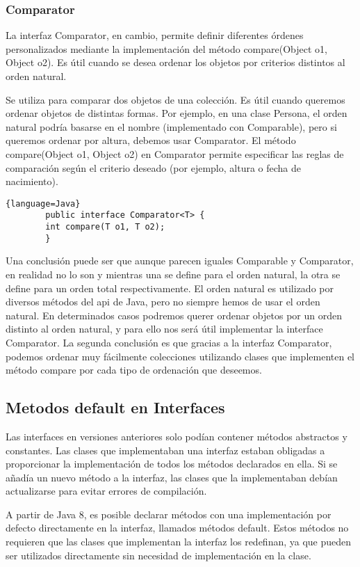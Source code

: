 \begin{center}
	\subsubsection{Comparator}

	La interfaz Comparator, en cambio, permite definir diferentes órdenes personalizados mediante la 
	implementación del método compare(Object o1, Object o2). Es útil cuando se desea ordenar los objetos 
	por criterios distintos al orden natural.

	Se utiliza para comparar dos objetos de una colección. Es útil cuando queremos ordenar objetos de 
	distintas formas. Por ejemplo, en una clase Persona, el orden natural podría basarse en el nombre 
	(implementado con Comparable), pero si queremos ordenar por altura, debemos usar Comparator.
	El método compare(Object o1, Object o2) en Comparator permite especificar las reglas de comparación según 
	el criterio deseado (por ejemplo, altura o fecha de nacimiento).

	\begin{lstlisting}{language=Java}
		public interface Comparator<T> {
		int compare(T o1, T o2);
		}
	\end{lstlisting}

	Una conclusión puede ser que aunque parecen iguales Comparable y Comparator, en realidad no lo son y
	mientras una se define para el orden natural, la otra se define para un orden total respectivamente. El orden
	natural es utilizado por diversos métodos del api de Java, pero no siempre hemos de usar el orden natural. En
	determinados casos podremos querer ordenar objetos por un orden distinto al orden natural, y para ello nos
	será útil implementar la interface Comparator.
	La segunda conclusión es que gracias a la interfaz Comparator, podemos ordenar muy fácilmente colecciones
	utilizando clases que implementen el método compare por cada tipo de ordenación que deseemos.


	\subsection{Metodos default en Interfaces}
	Las interfaces en versiones anteriores solo podían contener métodos abstractos y constantes.
	Las clases que implementaban una interfaz estaban obligadas a proporcionar la implementación de
	todos los métodos declarados en ella. Si se añadía un nuevo método a la interfaz, las clases que la 
	implementaban debían actualizarse para evitar errores de compilación.

	A partir de Java 8, es posible declarar métodos con una implementación por defecto directamente en la interfaz, 
	llamados métodos default.
	Estos métodos no requieren que las clases que implementan la interfaz los redefinan, ya que pueden ser utilizados 
	directamente sin necesidad de implementación en la clase.


\end{center}
